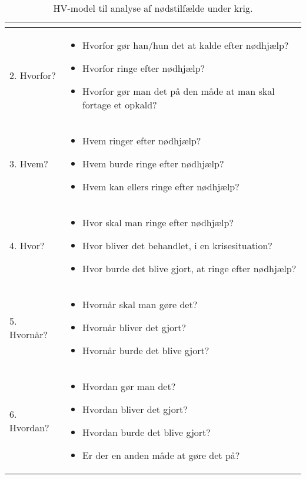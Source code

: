 \begin{table}[H]
\begin{tabular}{|p{4cm}|p{10cm}|}
\begin{itemize}
        \end{itemize} \\
        \hline
        2. Hvorfor? &
        \begin{itemize}
            \item Hvorfor gør han/hun det at kalde efter nødhjælp?
            \item Hvorfor ringe efter nødhjælp?
            \item Hvorfor gør man det på den måde at man skal fortage et opkald?
        \end{itemize} \\
        \hline
        3. Hvem? &
        \begin{itemize}
            \item Hvem ringer efter nødhjælp?
            \item Hvem burde ringe efter nødhjælp?
            \item Hvem kan ellers ringe efter nødhjælp?
        \end{itemize} \\
        \hline
        4. Hvor? &
        \begin{itemize}
            \item Hvor skal man ringe efter nødhjælp?
            \item Hvor bliver det behandlet, i en krisesituation?
            \item Hvor burde det blive gjort, at ringe efter nødhjælp?
        \end{itemize} \\
        \hline
        5. Hvornår? &
        \begin{itemize}
            \item Hvornår skal man gøre det?
            \item Hvornår bliver det gjort?
            \item Hvornår burde det blive gjort?
        \end{itemize} \\
        \hline
        6. Hvordan? &
        \begin{itemize}
            \item Hvordan gør man det?
            \item Hvordan bliver det gjort?
            \item Hvordan burde det blive gjort?
            \item Er der en anden måde at gøre det på?
        \end{itemize} \\
        \hline
    \end{tabular}
    \caption{HV-model til analyse af nødstilfælde under krig.}
    \label{tab:hv-model}
\end{table}

